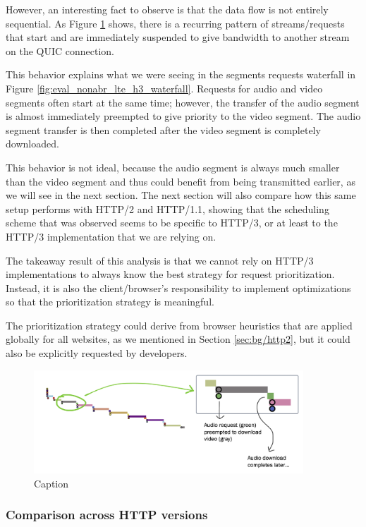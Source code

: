 However, an interesting fact to observe is that the data flow is not entirely sequential. As Figure \ref{fig:eval_noabr_qvis2} shows, there is a recurring pattern of streams/requests that start and are immediately suspended to give bandwidth to another stream on the QUIC connection.

This behavior explains what we were seeing in the segments requests waterfall in Figure \ref{fig:eval_nonabr_lte_h3_waterfall}. Requests for audio and video segments often start at the same time; however, the transfer of the audio segment is almost immediately preempted to give priority to the video segment. The audio segment transfer is then completed after the video segment is completely downloaded.

This behavior is not ideal, because the audio segment is always much smaller than the video segment and thus could benefit from being transmitted earlier, as we will see in the next section. The next section will also compare how this same setup performs with HTTP/2 and HTTP/1.1, showing that the scheduling scheme that was observed seems to be specific to HTTP/3, or at least to the HTTP/3 implementation that we are relying on.

The takeaway result of this analysis is that we cannot rely on HTTP/3 implementations to always know the best strategy for request prioritization. Instead, it is also the client/browser's responsibility to implement optimizations so that the prioritization strategy is meaningful.

The prioritization strategy could derive from browser heuristics that are applied globally for all websites, as we mentioned in Section \ref{sec:bg/http2}, but it could also be explicitly requested by developers.

\begin{figure}[h]
    \centering
    \includegraphics[width=0.9\textwidth]{res/eval_nonabr_qvis2.png}
    \caption{Caption}
    \label{fig:eval_noabr_qvis2}
\end{figure}

\subsubsection{Comparison across HTTP versions}
\label{sec:eval/non-abr/http-versions}

